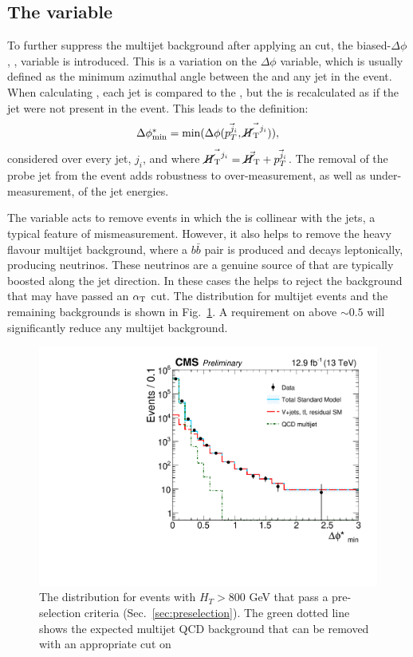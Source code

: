 \subsection{The \bdphi variable}

To further suppress the \QCD multijet background after applying an
\alphat cut, the biased-$\Delta\phi$, \bdphi, variable is introduced.
This is a variation on the $\Delta\phi$ variable, which is usually
defined as the minimum azimuthal angle between the \MET and any jet in
the event. When calculating \bdphi, each jet is compared to the
\MHT, but the \MHT is recalculated as if the jet were not present in
the event. This leads to the definition:
\begin{equation}
\mbox{$\Delta\phi^{*}_{\rm min}$} = \mathrm{min}(\Delta\phi(\vec{p_T^{j_i}},\vec{\mbox{$\cancel{H}_\text{T}$}^{j_i}})),
\end{equation}
considered over every jet, $j_i$, and where
$\vec{\mbox{$\cancel{H}_\text{T}$}^{j_i}}=\vec{\mbox{$\cancel{H}_\text{T}$}}+\vec{p_T^{j_i}}$. The removal of the
probe jet from the event adds robustness to over-measurement, as well
as under-measurement, of the jet energies.

The \bdphi variable acts to remove events in which the \MET is
collinear with the jets, a typical feature of mismeasurement. However,
it also helps to remove the heavy flavour \QCD multijet background,
where a $b\bar{b}$ pair is produced and decays leptonically, producing
neutrinos. These neutrinos are a genuine source of \MET that are
typically boosted along the jet direction. In these cases the \bdphi
helps to reject the \QCD background that may have passed an $\alpha_{\text{T}}$
cut. The \bdphi distribution for multijet events and the remaining \SM
backgrounds is shown in Fig.~\ref{fig:bdphi}. A requirement on \bdphi
above $\sim 0.5$ will significantly reduce any \QCD multijet background.

\begin{figure}
	\begin{center}
		\includegraphics[width=0.7\linewidth]{figs/analysis/eventSelection/CMS-PAS-SUS-16-016_Figure-aux_002}%
	\end{center}
  \caption{The \bdphi distribution for events with $H_T>800$ GeV that
  pass a pre-selection criteria (Sec.~\ref{sec:preselection}). The
  green dotted line shows the expected multijet QCD background that
  can be removed with an appropriate cut on \bdphi}
	\label{fig:bdphi}
\end{figure}

